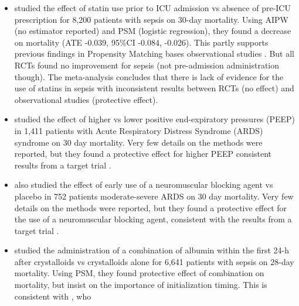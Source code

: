 \documentclass[french,12pt,twoside,a4paper]{book}
\begin{document}
\begin{appendices}
\begin{itemize}
    \item \cite{chinaeke2021impact} studied the effect of \textcolor{I}{statin use
            prior to ICU admission} vs \textcolor{C}{absence of pre-ICU
            prescription} for \textcolor{P}{8,200 patients with sepsis} on
          \textcolor{O}{30-day mortality}. Using AIPW (no estimator reported)
          and PSM (logistic regression), they found a decrease on mortality (ATE
          -0.039, 95\%CI -0.084, -0.026). This partly supports previous
          findings in Propensity Matching bases observational studies
          \citep{lee2017preadmission,kyu2019preadmission}. But all RCTs
          \citep{national2014rosuvastatin, singh2017effects} found no improvement for sepsis (not
          pre-admission administration though). The \cite{wan2014effect}
          meta-analysis concludes that there is lack of evidence for the use of
          statins in sepsis with inconsistent results between RCTs (no effect)
          and observational studies (protective effect).
    \item \cite{adibuzzaman2019323} studied the effect of \textcolor{I}{higher} vs
          \textcolor{C}{lower positive end-expiratory pressures (PEEP)} in
          \textcolor{P}{1,411 patients with Acute Respiratory Distress Syndrome
            (ARDS) syndrome} on \textcolor{O}{30 day mortality}. Very few details on
          the methods were reported, but they found a protective effect for higher PEEP
          consistent results from a target trial \citep{national2004higher}.
    \item \cite{adibuzzaman2019323} also studied the effect of \textcolor{I}{early
            use of a neuromuscular blocking agent } vs \textcolor{C}{placebo} in
          \textcolor{P}{752 patients moderate-severe ARDS} on \textcolor{O}{30
            day mortality}. Very few details on the methods were reported, but they found a
          protective effect for the use of a neuromuscular blocking agent,
          consistent with the results from a target trial
          \citep{papazian2010neuromuscular}.
    \item \cite{zhou2021early} studied the administration of \textcolor{I}{a
            combination of albumin within the first 24-h after crystalloids} vs
          \textcolor{C}{crystalloids alone} for \textcolor{P}{6,641 patients
            with sepsis} on \textcolor{O}{28-day mortality}. Using PSM, they found
          protective effect of combination on mortality, but insist on the
          importance of initialization timing. This is consistent with \cite{xu2014comparison}, who

\end{itemize}
\end{appendices}
\end{document}
